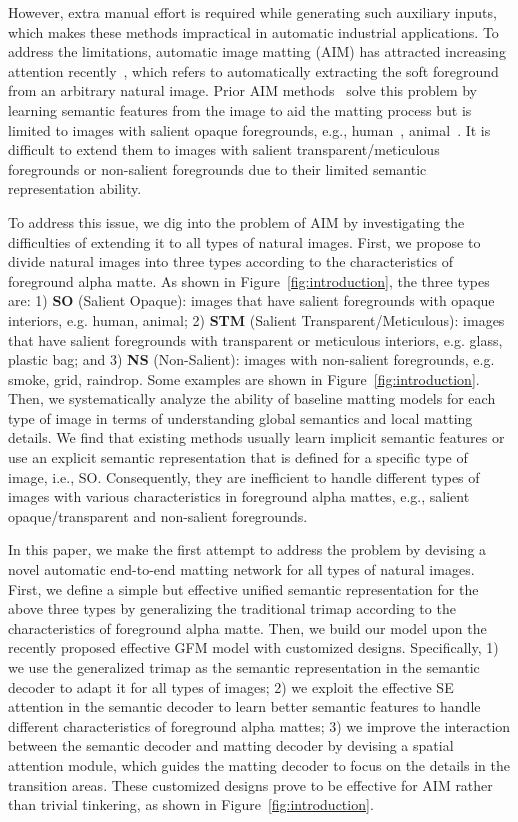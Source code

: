 \documentclass{article}
\begin{document}
However, extra manual effort is required while generating such auxiliary inputs, which makes these methods impractical in automatic industrial applications. To address the limitations, automatic image matting (AIM) has attracted increasing attention recently~\cite{zhang2019late}, which refers to automatically extracting the soft foreground from an arbitrary natural image. Prior AIM methods~\cite{Qiao_2020_CVPR,gfm} solve this problem by learning semantic features from the image to aid the matting process but is limited to images with salient opaque foregrounds, e.g., human~\cite{shen2016deep,chen2018semantic}, animal~\cite{gfm}. It is difficult to extend them to images with salient transparent/meticulous foregrounds or non-salient foregrounds due to their limited semantic representation ability. 

To address this issue, we dig into the problem of AIM by investigating the difficulties of extending it to all types of natural images. First, we propose to divide natural images into three types according to the characteristics of foreground alpha matte. As shown in Figure~\ref{fig:introduction}, the three types are: 1) \textbf{SO} (Salient Opaque): images that have salient foregrounds with opaque interiors, e.g. human, animal; 2) \textbf{STM} (Salient Transparent/Meticulous): images that have salient foregrounds with transparent or meticulous interiors, e.g. glass, plastic bag; and 3) \textbf{NS} (Non-Salient): images with non-salient foregrounds, e.g. smoke, grid, raindrop. Some examples are shown in Figure~\ref{fig:introduction}. Then, we systematically analyze the ability of baseline matting models for each type of image in terms of understanding global semantics and local matting details. We find that existing methods usually learn implicit semantic features or use an explicit semantic representation that is defined for a specific type of image, i.e., SO. Consequently, they are inefficient to handle different types of images with various characteristics in foreground alpha mattes, e.g., salient opaque/transparent and non-salient foregrounds.

In this paper, we make the first attempt to address the problem by devising a novel automatic end-to-end matting network for all types of natural images. First, we define a simple but effective unified semantic representation for the above three types by generalizing the traditional trimap according to the characteristics of foreground alpha matte. Then, we build our model upon the recently proposed effective GFM model \cite{gfm} with customized designs. Specifically, 1) we use the generalized trimap as the semantic representation in the semantic decoder to adapt it for all types of images; 2) we exploit the effective SE attention \cite{hu2018squeeze} in the semantic decoder to learn better semantic features to handle different characteristics of foreground alpha mattes; 3) we improve the interaction between the semantic decoder and matting decoder by devising a spatial attention module, which guides the matting decoder to focus on the details in the transition areas. These customized designs prove to be effective for AIM rather than trivial tinkering, as shown in Figure~\ref{fig:introduction}.
\end{document}
